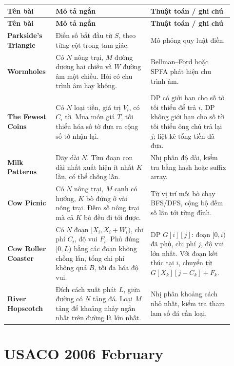 \documentclass[11pt]{article}
\newenvironment{solutiontable}{%
  \small
  \setlength{\tabcolsep}{4pt}
  \renewcommand{\arraystretch}{1.14}
  \begin{longtable}{L{0.19\linewidth}L{0.39\linewidth}L{0.34\linewidth}}
  \toprule
  \textbf{Tên bài} & \textbf{Mô tả ngắn} & \textbf{Thuật toán / ghi chú}\\
  \midrule
  \endfirsthead
  \toprule
  \textbf{Tên bài} & \textbf{Mô tả ngắn} & \textbf{Thuật toán / ghi chú}\\
  \midrule
  \endhead
}{%
  \bottomrule
  \end{longtable}
  \normalsize
}
\newcommand{\problemrow}[3]{\textbf{#1} & #2 & #3\\\midrule}
\begin{document}
\begin{solutiontable}
\problemrow{Parkside's Triangle}{Điền số bắt đầu từ \(S\), theo từng cột trong tam giác.}{Mô phỏng quy luật điền.}
\problemrow{Wormholes}{Có \(N\) nông trại, \(M\) đường dương hai chiều và \(W\) đường âm một chiều. Hỏi có chu trình âm hay không.}{Bellman--Ford hoặc SPFA phát hiện chu trình âm.}
\problemrow{The Fewest Coins}{Có \(N\) loại tiền, giá trị \(V_i\), có \(C_i\) tờ. Mua món giá \(T\), tối thiểu hóa số tờ đưa ra cộng số tờ nhận lại.}{DP có giới hạn cho số tờ tối thiểu để trả \(i\), DP không giới hạn cho số tờ tối thiểu ông chủ trả lại \(j\); liệt kê tổng tiền đã đưa.}
\problemrow{Milk Patterns}{Dãy dài \(N\). Tìm đoạn con dài nhất xuất hiện ít nhất \(K\) lần, có thể chồng lấn.}{Nhị phân độ dài, kiểm tra bằng hash hoặc suffix array.}
\problemrow{Cow Picnic}{Có \(N\) nông trại, \(M\) cạnh có hướng, \(K\) bò đứng ở vài nông trại. Đếm số nông trại mà cả \(K\) bò đều đi tới được.}{Từ vị trí mỗi bò chạy BFS/DFS, cộng bộ đếm số lần tới từng đỉnh.}
\problemrow{Cow Roller Coaster}{Có \(N\) đoạn \([X_i,X_i+W_i)\), chi phí \(C_i\), độ vui \(F_i\). Phủ đúng \([0,L)\) bằng các đoạn không chồng lấn, tổng chi phí không quá \(B\), tối đa hóa độ vui.}{DP \(G[i][j]\): đoạn \([0,i)\) đã phủ, chi phí \(j\), độ vui lớn nhất. Với đoạn kết thúc tại \(i\), chuyển từ \(G[X_k][j-C_k]+F_k\).}
\problemrow{River Hopscotch}{Đích cách xuất phát \(L\), giữa đường có \(N\) tảng đá. Loại \(M\) tảng để khoảng nhảy ngắn nhất trên đường là lớn nhất.}{Nhị phân khoảng cách nhỏ nhất, kiểm tra tham lam số đá cần loại.}
\end{solutiontable}

\section{USACO 2006 February}
\end{document}
